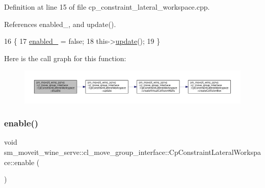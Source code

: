 Definition at line 15 of file cp\+\_\+constraint\+\_\+lateral\+\_\+workspace.\+cpp.



References enabled\+\_\+, and update().


\begin{DoxyCode}
16         \{
17             \hyperlink{classsm__moveit__wine__serve_1_1cl__move__group__interface_1_1CpConstraintLateralWorkspace_a98fd9192d4b36e1b416ce7d90536c8de}{enabled\_} = \textcolor{keyword}{false};
18             this->\hyperlink{classsm__moveit__wine__serve_1_1cl__move__group__interface_1_1CpConstraintLateralWorkspace_a76692ba49429efb9e704cd8fdcf6ec0b}{update}();
19         \}
\end{DoxyCode}
Here is the call graph for this function\+:
\nopagebreak
\begin{figure}[H]
\begin{center}
\leavevmode
\includegraphics[width=350pt]{classsm__moveit__wine__serve_1_1cl__move__group__interface_1_1CpConstraintLateralWorkspace_a52e23577f44d458497ae76f2019120da_cgraph}
\end{center}
\end{figure}
\mbox{\label{classsm__moveit__wine__serve_1_1cl__move__group__interface_1_1CpConstraintLateralWorkspace_a162757c8626fed8ddab25ddb85f97ae5}} 
\subsubsection{\texorpdfstring{enable()}{enable()}}
{\footnotesize\ttfamily void sm\+\_\+moveit\+\_\+wine\+\_\+serve\+::cl\+\_\+move\+\_\+group\+\_\+interface\+::\+Cp\+Constraint\+Lateral\+Workspace\+::enable (\begin{DoxyParamCaption}{ }\end{DoxyParamCaption})}



